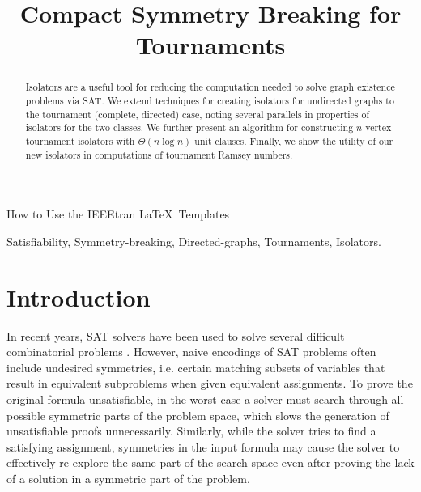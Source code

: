 \documentclass[conference]{IEEEtran}
\begin{document}
\title{Compact Symmetry Breaking for Tournaments}

\author{
}

%
{How to Use the IEEEtran \LaTeX \ Templates}

\maketitle

\begin{abstract}
Isolators are a useful tool for reducing the computation needed to solve graph existence problems via SAT.  We extend techniques for creating isolators for undirected graphs to the tournament (complete, directed) case, noting several parallels in properties of isolators for the two classes. We further present an algorithm for constructing $n$-vertex tournament isolators with $\Theta(n \log n)$ unit clauses. Finally, we show the utility of our new isolators in computations of tournament Ramsey numbers.
\end{abstract}

\begin{IEEEkeywords}
Satisfiability, Symmetry-breaking, Directed-graphs, Tournaments, Isolators.
\end{IEEEkeywords}


\section{Introduction}

In recent years, SAT solvers have been used to solve several difficult combinatorial problems \cite{ref_keller,ref_schur,ref_pythagorean}. However, naive encodings of SAT problems often include undesired symmetries, i.e. certain matching subsets of variables that result in equivalent subproblems when given equivalent assignments. To prove the original formula unsatisfiable, in the worst case a solver must search through all possible symmetric parts of the problem space, which slows the generation of unsatisfiable proofs unnecessarily. Similarly, while the solver tries to find a satisfying assignment, symmetries in the input formula may cause the solver to effectively re-explore the same part of the search space even after proving the lack of a solution in a symmetric part of the problem.
\end{document}
